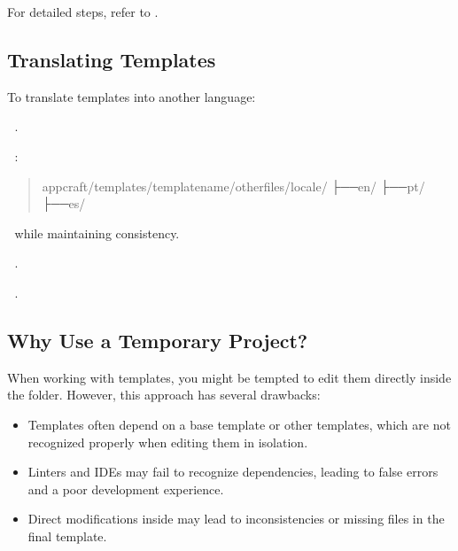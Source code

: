\documentclass[letterpaper,10pt,english]{sphinxhowto}
\begin{document}
\sphinxAtStartPar
For detailed steps, refer to {\hyperref[\detokenize{contributing/index:id2}]{}}.


\subsection{Translating Templates}
\label{\detokenize{contributing/index:id5}}
\sphinxAtStartPar
To translate templates into another language:

️⃣ .

️⃣ :
\begin{quote}

\begin{sphinxVerbatim}[commandchars=\\\{\}]
appcraft/templates/\PYGZlt{}template\PYGZus{}name\PYGZgt{}/other\PYGZus{}files/locale/
├──en/
├──pt/
├──es/
\end{sphinxVerbatim}
\end{quote}

️⃣  while maintaining consistency.

️⃣ .

️⃣ .


\subsection{Why Use a Temporary Project?}
\label{\detokenize{contributing/index:why-use-a-temporary-project}}
\sphinxAtStartPar
When working with templates, you might be tempted to edit them directly inside the  folder. However, this approach has several drawbacks:
\begin{itemize}
\item {} 
\sphinxAtStartPar
{} Templates often depend on a base template or other templates, which are not recognized properly when editing them in isolation.

\item {} 
\sphinxAtStartPar
{} Linters and IDEs may fail to recognize dependencies, leading to false errors and a poor development experience.

\item {} 
\sphinxAtStartPar
{} Direct modifications inside  may lead to inconsistencies or missing files in the final template.

\end{itemize}
\end{document}

